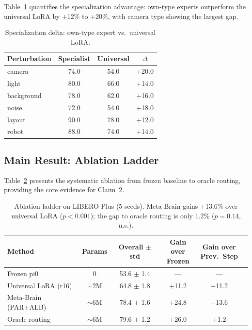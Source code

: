 \documentclass[conference]{article}
\newcommand{\ours}{Meta-Brain}
\newcommand{\liberoplus}{LIBERO-Plus}
\begin{document}
Table~\ref{tab:spec_delta} quantifies the specialization advantage: own-type experts outperform the universal LoRA by +12\% to +20\%, with camera type showing the largest gap.

\begin{table}[h]
\centering
\caption{Specialization delta: own-type expert vs.\ universal LoRA.}
\label{tab:spec_delta}
\small
\begin{tabular}{lccc}
\toprule
Perturbation & Specialist & Universal & $\Delta$ \\
\midrule
camera & 74.0 & 54.0 & +20.0 \\
light & 80.0 & 66.0 & +14.0 \\
background & 78.0 & 62.0 & +16.0 \\
noise & 72.0 & 54.0 & +18.0 \\
layout & 90.0 & 78.0 & +12.0 \\
robot & 88.0 & 74.0 & +14.0 \\
\bottomrule
\end{tabular}
\end{table}

\subsection{Main Result: Ablation Ladder}
\label{sec:ablation_ladder}

Table~\ref{tab:ablation_ladder} presents the systematic ablation from frozen baseline to oracle routing, providing the core evidence for Claim~2.

\begin{table}[h]
\centering
\caption{Ablation ladder on \liberoplus{} (5 seeds). \ours{} gains +13.6\% over universal LoRA ($p<0.001$); the gap to oracle routing is only 1.2\% ($p=0.14$, n.s.).}
\label{tab:ablation_ladder}
\small
\begin{tabular}{lccccc}
\toprule
Method & Params & Overall $\pm$ std & \makecell{Gain over\\Frozen} & \makecell{Gain over\\Prev.\ Step} \\
\midrule
Frozen pi0 & 0 & 53.6 $\pm$ 1.4 & --- & --- \\
Universal LoRA (r16) & $\sim$2M & 64.8 $\pm$ 1.8 & +11.2 & +11.2 \\
\ours{} (PAR+ALB) & $\sim$6M & 78.4 $\pm$ 1.6 & +24.8 & +13.6 \\
Oracle routing & $\sim$6M & 79.6 $\pm$ 1.2 & +26.0 & +1.2 \\
\bottomrule
\end{tabular}
\end{table}
\end{document}
